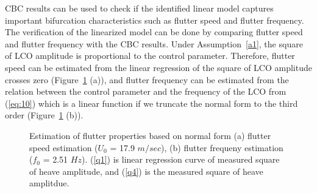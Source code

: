 \documentclass[openacc]{rsproca_new}%
\newcommand{\Eref}[1]{(\ref{#1})}
\newcommand{\Fref}[1]{Figure~\ref{#1}}
\newcommand{\asref}[1]{Assumption~\ref{#1}}
\begin{document}
\noindent CBC results can be used to check if the identified linear model captures important bifurcation characteristics such as flutter speed and flutter frequency. The verification of the linearized model can be done by comparing flutter speed and flutter frequency with the CBC results. Under \asref{a1}, the square of LCO amplitude is proportional to the control parameter. Therefore, flutter speed can be estimated from the linear regression of the square of LCO amplitude crosses zero (\Fref{f:6} (a)), and flutter frequency can be estimated from the relation between the control parameter and the frequency of the LCO from \Eref{eq:10} which is a linear function if we truncate the normal form to the third order (\Fref{f:6} (b)).

\begin{figure}
  \centering
\caption{Estimation of flutter properties based on normal form (a) flutter speed estimation ($U_0$ = 17.9 $m/sec$), (b) flutter frequeny estimation ($f_0$ = 2.51 $Hz$). (\ref{q1}) is linear regression curve of measured square of heave amplitude, and (\ref{q4}) is the measured square of heave amplitdue.}
\label{f:6}
\end{figure}
\end{document}
